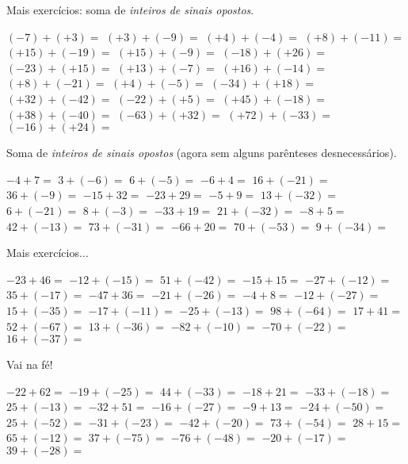 \begin{questions}
\begin{choices}
\end{choices}


	\question Mais exercícios: soma de \textit{inteiros de sinais opostos}.

\begin{choices}
	
	\choice $(-7)+(+3)=$
	\choice $(+3)+(-9)=$
	\choice $(+4)+(-4)=$
	\choice $(+8)+(-11)=$
	\choice $(+15)+(-19)=$
	\choice $(+15)+(-9)=$
	\choice $(-18)+(+26)=$
	\choice $(-23)+(+15)=$
	\choice $(+13)+(-7)=$
	\choice $(+16)+(-14)=$
	\choice $(+8)+(-21)=$
	\choice $(+4)+(-5)=$
	\choice $(-34)+(+18)=$
	\choice $(+32)+(-42)=$
	\choice $(-22)+(+5)=$
	\choice $(+45)+(-18)=$
	\choice $(+38)+(-40)=$
	\choice $(-63)+(+32)=$
	\choice $(+72)+(-33)=$
	\choice $(-16)+(+24)=$
	
\end{choices}

	\question Soma de \textit{inteiros de sinais opostos} (agora sem alguns parênteses desnecessários).

\begin{choices}
	
	\choice $-4 + 7=$
	\choice $3 + (-6)=$
	\choice $6 + (-5)=$
	\choice $-6 + 4=$
	\choice $16 + (-21)=$
	\choice $36 + (-9)=$
	\choice $-15 + 32=$
	\choice $-23 + 29=$
	\choice $-5 + 9=$
	\choice $13 + (-32)=$
	\choice $6 + (-21)=$
	\choice $8 + (-3)=$
	\choice $-33 + 19=$
	\choice $21 + (-32)=$
	\choice $-8 + 5=$
	\choice $42 + (-13)=$
	\choice $73 + (-31)=$
	\choice $-66 + 20=$
	\choice $70 + (-53)=$
	\choice $9 + (-34)=$
	

\end{choices}

	\question Mais exercícios$\ldots$

\begin{choices}
	
	\choice $-23 + 46=$
	\choice $-12 + (-15)=$
	\choice $51 + (-42)=$
	\choice $-15 + 15=$
	\choice $-27 + (-12)=$
	\choice $35 + (-17)=$
	\choice $-47 + 36=$
	\choice $-21 +(-26)=$
	\choice $-4 + 8=$
	\choice $-12 + (-27)=$
	\choice $15 + (-35)=$
	\choice $-17 + (-11)=$
	\choice $-25 + (-13)=$
	\choice $98 + (-64)=$
	\choice $17 + 41=$
	\choice $52 + (-67)=$
	\choice $13 + (-36)=$
	\choice $-82 + (-10)=$
	\choice $-70 + (-22)=$
	\choice $16 + (-37)=$
	
\end{choices}

	\question Vai na fé!

\begin{choices}
	
	\choice $-22 + 62=$
	\choice $-19 + (-25)=$
	\choice $44 + (-33)=$
	\choice $-18 + 21=$
	\choice $-33 + (-18)=$
	\choice $25 + (-13)=$
	\choice $-32 + 51=$
	\choice $-16 + (-27)=$
	\choice $-9 + 13=$
	\choice $-24 + (-50)=$
	\choice $25 + (-52)=$
	\choice $-31 + (-23)=$
	\choice $-42 + (-20)=$
	\choice $73 + (-54)=$
	\choice $28 + 15=$
	\choice $65 + (-12)=$
	\choice $37 + (-75)=$
	\choice $-76 +(-48)=$
	\choice $-20 + (-17)=$
	\choice $39 + (-28)=$

	
\end{choices}


\end{questions}